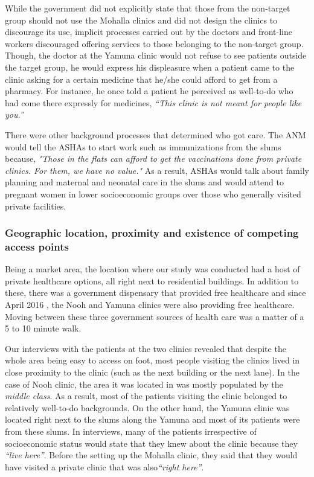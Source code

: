 While the government did not explicitly state that those from the non-target group should not use the Mohalla clinics and did not design the clinics to discourage its use, implicit processes carried out by the doctors and front-line workers discouraged offering services to those belonging to the non-target group. Though, the doctor at the Yamuna clinic would not refuse to see patients outside the target group, he would express his displeasure when a patient came to the clinic asking for a certain medicine that he/she could afford to get from a pharmacy. For instance, he once told a patient he perceived as well-to-do who had come there expressly for medicines, \textit{``This clinic is not meant for people like you.''} %

There were other background processes that determined who got care. The ANM  %
would tell the ASHAs to start work such as immunizations from the slums because, \textit{"Those in the flats can afford to get the vaccinations done from private clinics. For them, we have no value."} As a result, ASHAs would talk about family planning and maternal and neonatal care in the slums and would attend to pregnant women in lower socioeconomic groups over those who generally visited private facilities.

\subsubsection{Geographic location, proximity and existence of competing access points}
Being a market area, the location where our study was conducted had a host of private healthcare options, all right next to residential buildings. In addition to these, there was a government dispensary that provided free healthcare and since April 2016 %
, the Nooh and Yamuna clinics were also providing free healthcare. Moving between these three government sources of health care was a matter of a 5 to 10 minute walk.

Our interviews with the patients at the two clinics revealed that despite the whole area being easy to access on foot, %
most people visiting the clinics lived in close proximity to the clinic (such as the next building or the next lane). %
In the case of Nooh clinic, the area it was located in was mostly populated by the \textit{middle class}. As a result, most of the patients visiting the clinic belonged to relatively well-to-do backgrounds. On the other hand, the Yamuna clinic was located right next to the slums along the Yamuna and most of its patients were from these slums. In interviews, many of the patients irrespective of socioeconomic status would state that they knew about the clinic because they \textit{``live here''}. Before the setting up the Mohalla clinic, they said that they would have visited a private clinic that was also\textit{``right here''}. %


